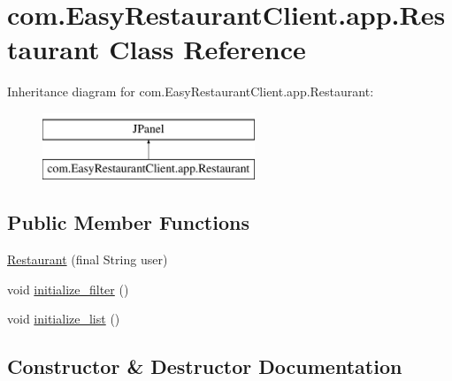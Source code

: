 \hypertarget{classcom_1_1_easy_restaurant_client_1_1app_1_1_restaurant}{}\section{com.\+Easy\+Restaurant\+Client.\+app.\+Restaurant Class Reference}
\label{classcom_1_1_easy_restaurant_client_1_1app_1_1_restaurant}
Inheritance diagram for com.\+Easy\+Restaurant\+Client.\+app.\+Restaurant\+:\begin{figure}[H]
\begin{center}
\leavevmode
\includegraphics[height=2.000000cm]{classcom_1_1_easy_restaurant_client_1_1app_1_1_restaurant}
\end{center}
\end{figure}
\subsection*{Public Member Functions}
\begin{DoxyCompactItemize}
\item 
\mbox{\hyperlink{classcom_1_1_easy_restaurant_client_1_1app_1_1_restaurant_a7ffb540391f38586ca8c8c097aee82c9}{Restaurant}} (final String user)
\item 
void \mbox{\hyperlink{classcom_1_1_easy_restaurant_client_1_1app_1_1_restaurant_a1a9bc07c10ae7f0e4ba3291c275dda34}{initialize\+\_\+filter}} ()
\item 
void \mbox{\hyperlink{classcom_1_1_easy_restaurant_client_1_1app_1_1_restaurant_a6c5df9953401d5eb446c0db8685c1a19}{initialize\+\_\+list}} ()
\end{DoxyCompactItemize}


\subsection{Constructor \& Destructor Documentation}
\mbox{\label{classcom_1_1_easy_restaurant_client_1_1app_1_1_restaurant_a7ffb540391f38586ca8c8c097aee82c9}} 
